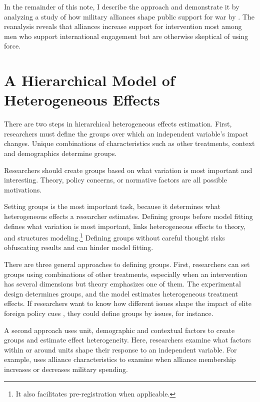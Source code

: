 \documentclass[12pt]{article}
\begin{document}
In the remainder of this note, I describe the approach and demonstrate it by analyzing a study of how military alliances shape public support for war by \citet{TomzWeeks2021}. 
The reanalysis reveals that alliances increase support for intervention most among men who support international engagement but are otherwise skeptical of using force. 



\section{A Hierarchical Model of Heterogeneous Effects}


There are two steps in hierarchical heterogeneous effects estimation. 
First, researchers must define the groups over which an independent variable's impact changes. 
Unique combinations of characteristics such as other treatments, context and demographics determine groups.


Researchers should create groups based on what variation is most important and interesting. 
Theory, policy concerns, or normative factors are all possible motivations. 


Setting groups is the most important task, because it determines what heterogeneous effects a researcher estimates. 
Defining groups before model fitting defines what variation is most important, links heterogeneous effects to theory, and structures modeling.\footnote{It also facilitates pre-registration when applicable.}
Defining groups without careful thought risks obfuscating results and can hinder model fitting.   


There are three general approaches to defining groups.  
First, researchers can set groups using combinations of other treatments, especially when an intervention has several dimensions but theory emphasizes one of them. 
The experimental design determines groups, and the model estimates heterogeneous treatment effects.   
If researchers want to know how different issues shape the impact of elite foreign policy cues \citep{GuisingerSaunders2017}, they could define groups by issues, for instance.


A second approach uses unit, demographic and contextual factors to create groups and estimate  effect heterogeneity. 
Here, researchers examine what factors within or around units shape their response to an independent variable.
For example, \citet{Alley2021isq} uses alliance characteristics to examine when alliance membership increases or decreases military spending.
\end{document}
